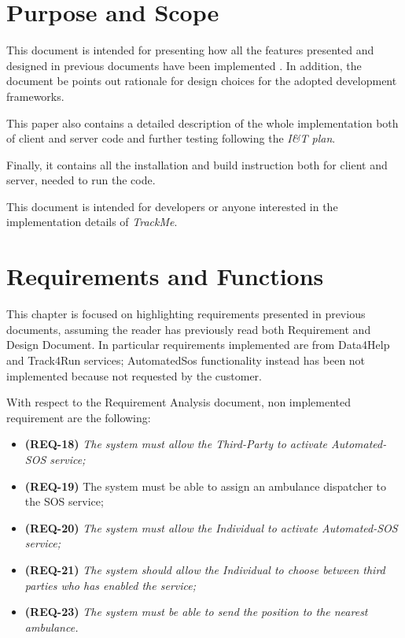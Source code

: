 \documentclass[a4paper]{article}
\begin{document}

\tableofcontents
\newpage
{}
\section{Purpose and Scope}
This document is intended for presenting how all the features presented and designed in previous documents have been implemented \cite{dd}\cite{rasd}. In addition, the document be points out rationale for design choices for the adopted development frameworks.

This paper also contains a detailed description of the whole implementation both of client and server code and further testing following the \textit{I\&T plan}.

Finally, it contains all the installation and build instruction both for client and server, needed to run the code.

This document is intended for developers or anyone interested in the implementation details of \textit{TrackMe}.

\newpage
\section{Requirements and Functions}
This chapter is focused on highlighting requirements presented in previous documents, assuming the reader has previously read both Requirement and Design Document. In particular requirements implemented are from Data4Help and Track4Run services; AutomatedSos functionality instead has been not implemented because not requested by the customer.

With respect to the Requirement Analysis document, non implemented requirement are the following:
\begin{itemize}
    \item \textbf{(REQ-18)} \textit{The system must allow the Third-Party to activate Automated-SOS service;}
    \item \textbf{(REQ-19)} The system must be able to assign an ambulance dispatcher to the SOS service;
    \item \textbf{(REQ-20)} \textit{The system must allow the Individual to activate Automated-SOS service;}
    \item \textbf{(REQ-21)} \textit{The system should allow the Individual to choose between third parties who has enabled the service;}
    \item \textbf{(REQ-23)} \textit{The system must be able to send the position to the nearest ambulance.}
\end{itemize}
\end{document}
